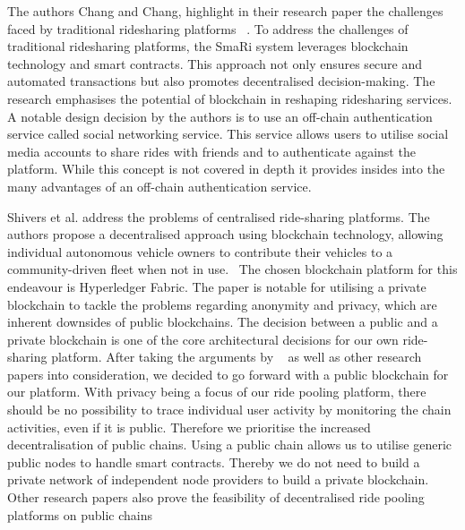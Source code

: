 The authors Chang and Chang, highlight in their research paper the challenges faced by traditional ridesharing platforms ~\cite{Chang.}. To address the challenges of traditional ridesharing platforms, the SmaRi system leverages blockchain technology and smart contracts. This approach not only ensures secure and automated transactions but also promotes decentralised decision-making. The research emphasises the potential of blockchain in reshaping ridesharing services. A notable design decision by the authors is to use an off-chain authentication service called social networking service. This service allows users to utilise social media accounts to share rides with friends and to authenticate against the platform. While this concept is not covered in depth it provides insides into the many advantages of an off-chain authentication service.

Shivers et al. address the problems of centralised ride-sharing platforms. The authors propose a decentralised approach using blockchain technology, allowing individual autonomous vehicle owners to contribute their vehicles to a community-driven fleet when not in use.~\cite{Shivers.} The chosen blockchain platform for this endeavour is Hyperledger Fabric. The paper is notable for utilising a private blockchain to tackle the problems regarding anonymity and privacy, which are inherent downsides of public blockchains. The decision between a public and a private blockchain is one of the core architectural decisions for our own ride-sharing platform.  After taking the arguments by ~\cite{Shivers.} as well as other research papers into consideration, we decided to go forward with a public blockchain for our platform. With privacy being a focus of our ride pooling platform, there should be no possibility to trace individual user activity by monitoring the chain activities, even if it is public. Therefore we prioritise the increased decentralisation of public chains. Using a public chain allows us to utilise generic public nodes to handle smart contracts. Thereby we do not need to build a private network of independent node providers to build a private blockchain. Other research papers also prove the feasibility of decentralised ride pooling platforms on public chains ~\cite{Mahmoud.2022} ~\cite{Joseph.} ~\cite{Baza.52520205282020}

